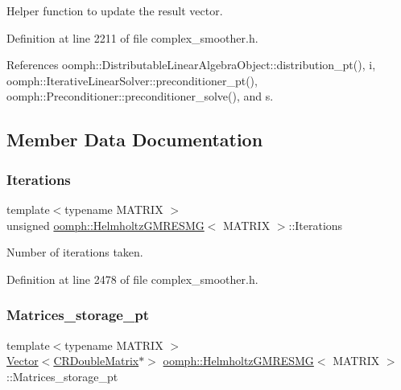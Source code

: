 Helper function to update the result vector. 



Definition at line 2211 of file complex\+\_\+smoother.\+h.



References oomph\+::\+Distributable\+Linear\+Algebra\+Object\+::distribution\+\_\+pt(), i, oomph\+::\+Iterative\+Linear\+Solver\+::preconditioner\+\_\+pt(), oomph\+::\+Preconditioner\+::preconditioner\+\_\+solve(), and s.



\subsection{Member Data Documentation}
\mbox{\label{classoomph_1_1HelmholtzGMRESMG_ae2a4718545bd42acb57aba5baa23d52f}} 
\subsubsection{\texorpdfstring{Iterations}{Iterations}}
{\footnotesize\ttfamily template$<$typename M\+A\+T\+R\+IX $>$ \\
unsigned \hyperlink{classoomph_1_1HelmholtzGMRESMG}{oomph\+::\+Helmholtz\+G\+M\+R\+E\+S\+MG}$<$ M\+A\+T\+R\+IX $>$\+::Iterations\hspace{0.3cm}{\ttfamily [protected]}}



Number of iterations taken. 



Definition at line 2478 of file complex\+\_\+smoother.\+h.

\mbox{\label{classoomph_1_1HelmholtzGMRESMG_a5d8ae2181aecf890386ae48d81f90b42}} 
\subsubsection{\texorpdfstring{Matrices\+\_\+storage\+\_\+pt}{Matrices\_storage\_pt}}
{\footnotesize\ttfamily template$<$typename M\+A\+T\+R\+IX $>$ \\
\hyperlink{classoomph_1_1Vector}{Vector}$<$\hyperlink{classoomph_1_1CRDoubleMatrix}{C\+R\+Double\+Matrix}$\ast$$>$ \hyperlink{classoomph_1_1HelmholtzGMRESMG}{oomph\+::\+Helmholtz\+G\+M\+R\+E\+S\+MG}$<$ M\+A\+T\+R\+IX $>$\+::Matrices\+\_\+storage\+\_\+pt\hspace{0.3cm}{\ttfamily [protected]}}



